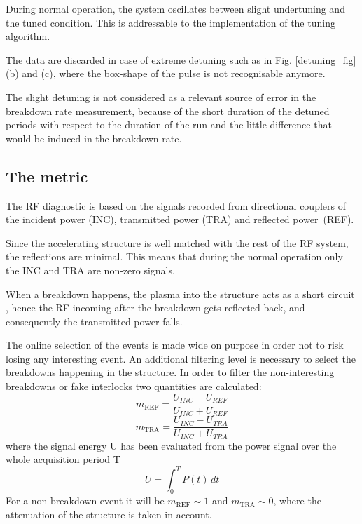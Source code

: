 During normal operation, the system oscillates between slight undertuning and the tuned condition. This is addressable to the implementation of the tuning algorithm.  

The data are discarded in case of extreme detuning such as in Fig. \ref{detuning_fig} (b) and (c), where the box-shape of the pulse is not recognisable anymore.

The slight detuning is not considered as a relevant source of error in the breakdown rate measurement,  because of the short duration of the detuned periods with respect to the duration of the run and the little difference that would be induced in the breakdown rate.



\subsection[The metric]{The metric}

The RF diagnostic is based on the signals recorded from directional couplers of the incident power (INC), transmitted power (TRA) and reflected power~(REF). 

Since the accelerating structure is well matched with the rest of the RF system, the reflections are minimal. This means that during the normal operation only the INC and TRA are non-zero signals.

When a breakdown happens, the plasma into the structure acts as a short circuit \cite{Degiovanni:2025952}, hence the RF incoming after the breakdown gets reflected back, and consequently the transmitted power falls. 

The online selection of the events is made wide on purpose in order not to risk losing any interesting event. An additional filtering level is necessary to select the breakdowns happening in the structure. In order to filter the non-interesting breakdowns or fake interlocks two quantities are calculated:
\begin{equation}
m_{\text{REF}}  =  \frac{ U_{INC} -  U_{REF}   }{  U_{INC} + U_{REF}   }
\end{equation}
\begin{equation}
m_{\text{TRA}}  =  \frac{ U_{INC} -  U_{TRA}   }{  U_{INC} +  U_{TRA}   }
\end{equation}
where the signal energy U has been evaluated from the power signal over the whole acquisition period T
\begin{equation}
U = \int_0^T P(t) \, dt
\end{equation}
For a non-breakdown event it will be $m_{\text{REF}} \sim 1$ and $m_{\text{TRA}} \sim 0$, where the attenuation of the structure is taken in account.

